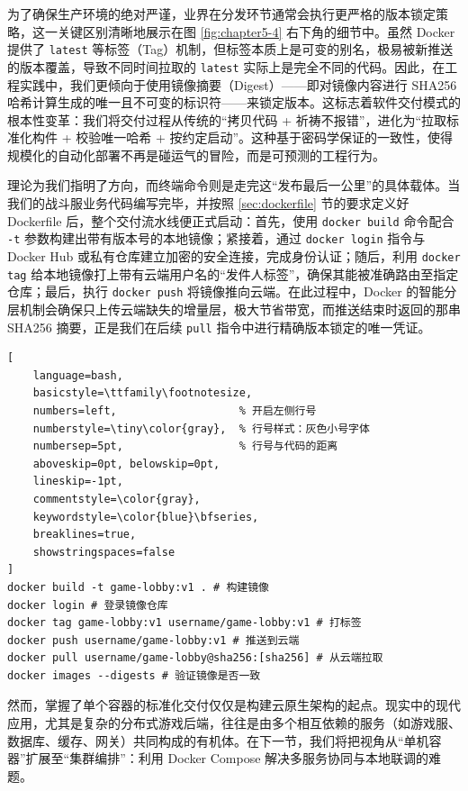 为了确保生产环境的绝对严谨，业界在分发环节通常会执行更严格的版本锁定策略，这一关键区别清晰地展示在图 \ref{fig:chapter5-4} 右下角的细节中。虽然 Docker 提供了 \texttt{latest} 等标签（Tag）机制，但标签本质上是可变的别名，极易被新推送的版本覆盖，导致不同时间拉取的 \texttt{latest} 实际上是完全不同的代码。因此，在工程实践中，我们更倾向于使用镜像摘要（Digest）——即对镜像内容进行 SHA256 哈希计算生成的唯一且不可变的标识符——来锁定版本。这标志着软件交付模式的根本性变革：我们将交付过程从传统的“拷贝代码 + 祈祷不报错”，进化为“拉取标准化构件 + 校验唯一哈希 + 按约定启动”。这种基于密码学保证的一致性，使得规模化的自动化部署不再是碰运气的冒险，而是可预测的工程行为。

理论为我们指明了方向，而终端命令则是走完这“发布最后一公里”的具体载体。当我们的战斗服业务代码编写完毕，并按照 \ref{sec:dockerfile} 节的要求定义好 Dockerfile 后，整个交付流水线便正式启动：首先，使用 \texttt{docker build} 命令配合 \texttt{-t} 参数构建出带有版本号的本地镜像；紧接着，通过 \texttt{docker login} 指令与 Docker Hub 或私有仓库建立加密的安全连接，完成身份认证；随后，利用 \texttt{docker tag} 给本地镜像打上带有云端用户名的“发件人标签”，确保其能被准确路由至指定仓库；最后，执行 \texttt{docker push} 将镜像推向云端。在此过程中，Docker 的智能分层机制会确保只上传云端缺失的增量层，极大节省带宽，而推送结束时返回的那串 SHA256 摘要，正是我们在后续 \texttt{pull} 指令中进行精确版本锁定的唯一凭证。

\begin{tcolorbox}[title=镜像发布与版本锁定实操]
\begin{lstlisting}[
    language=bash,
    basicstyle=\ttfamily\footnotesize,
    numbers=left,                   % 开启左侧行号
    numberstyle=\tiny\color{gray},  % 行号样式：灰色小号字体
    numbersep=5pt,                  % 行号与代码的距离
    aboveskip=0pt, belowskip=0pt,
    lineskip=-1pt,
    commentstyle=\color{gray},
    keywordstyle=\color{blue}\bfseries,
    breaklines=true,
    showstringspaces=false
]
docker build -t game-lobby:v1 . # 构建镜像
docker login # 登录镜像仓库
docker tag game-lobby:v1 username/game-lobby:v1 # 打标签
docker push username/game-lobby:v1 # 推送到云端
docker pull username/game-lobby@sha256:[sha256] # 从云端拉取
docker images --digests # 验证镜像是否一致 
\end{lstlisting}
\end{tcolorbox}


然而，掌握了单个容器的标准化交付仅仅是构建云原生架构的起点。现实中的现代应用，尤其是复杂的分布式游戏后端，往往是由多个相互依赖的服务（如游戏服、数据库、缓存、网关）共同构成的有机体。在下一节，我们将把视角从“单机容器”扩展至“集群编排”：利用 Docker Compose 解决多服务协同与本地联调的难题。



